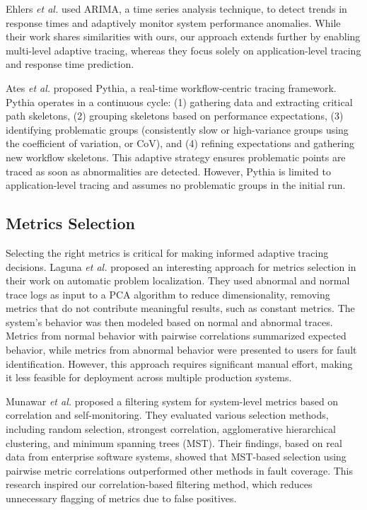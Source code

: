 \documentclass[pdflatex,sn-nature]{sn-jnl}%
\theoremstyle{thmstyleone}%
\theoremstyle{thmstyletwo}%
\theoremstyle{thmstylethree}%
\begin{document}
Ehlers \textit{et al.} \cite{ehlers2011self} used ARIMA, a time series analysis technique, to detect trends in response times and adaptively monitor system performance anomalies. While their work shares similarities with ours, our approach extends further by enabling multi-level adaptive tracing, whereas they focus solely on application-level tracing and response time prediction.

Ates \textit{et al.} \cite{ates2019automated} proposed Pythia, a real-time workflow-centric tracing framework. Pythia operates in a continuous cycle: (1) gathering data and extracting critical path skeletons, (2) grouping skeletons based on performance expectations, (3) identifying problematic groups (consistently slow or high-variance groups using the coefficient of variation, or CoV), and (4) refining expectations and gathering new workflow skeletons. This adaptive strategy ensures problematic points are traced as soon as abnormalities are detected. However, Pythia is limited to application-level tracing and assumes no problematic groups in the initial run.


\subsection{Metrics Selection}

Selecting the right metrics is critical for making informed adaptive tracing decisions. Laguna \textit{et al.} \cite{laguna2013automatic} proposed an interesting approach for metrics selection in their work on automatic problem localization. They used abnormal and normal trace logs as input to a PCA algorithm to reduce dimensionality, removing metrics that do not contribute meaningful results, such as constant metrics. The system's behavior was then modeled based on normal and abnormal traces. Metrics from normal behavior with pairwise correlations summarized expected behavior, while metrics from abnormal behavior were presented to users for fault identification. However, this approach requires significant manual effort, making it less feasible for deployment across multiple production systems.

Munawar \textit{et al.} \cite{munawar2009filtering} proposed a filtering system for system-level metrics based on correlation and self-monitoring. They evaluated various selection methods, including random selection, strongest correlation, agglomerative hierarchical clustering, and minimum spanning trees (MST). Their findings, based on real data from enterprise software systems, showed that MST-based selection using pairwise metric correlations outperformed other methods in fault coverage. This research inspired our correlation-based filtering method, which reduces unnecessary flagging of metrics due to false positives.
\end{document}
